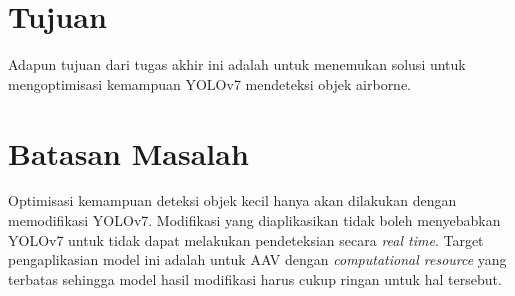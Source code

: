 \section{Tujuan}
    Adapun tujuan dari tugas akhir ini adalah untuk menemukan solusi untuk mengoptimisasi kemampuan YOLOv7 mendeteksi objek airborne.

\section{Batasan Masalah}
    Optimisasi kemampuan deteksi objek kecil hanya akan dilakukan dengan memodifikasi YOLOv7.
    Modifikasi yang diaplikasikan tidak boleh menyebabkan YOLOv7 untuk tidak dapat melakukan pendeteksian secara \emph{real time}.
    Target pengaplikasian model ini adalah untuk AAV dengan \emph{computational resource} yang terbatas sehingga model hasil modifikasi harus cukup ringan untuk hal tersebut.
